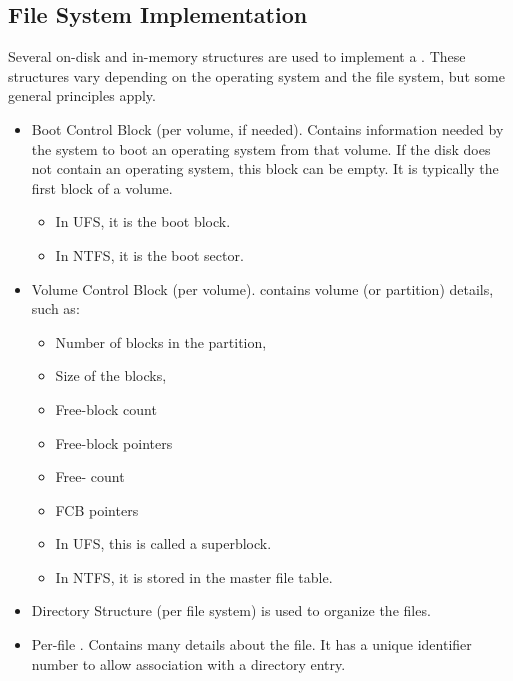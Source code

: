 \subsection{File System Implementation}\label{subsec:FS_Implementation}
Several on-disk and in-memory structures are used to implement a .
These structures vary depending on the operating system and the file system, but some general principles apply.

\begin{itemize}[noitemsep]
\item Boot Control Block (per volume, if needed).
  Contains information needed by the system to boot an operating system from that volume.
  If the disk does not contain an operating system, this block can be empty.
  It is typically the first block of a volume.
  \begin{itemize}[noitemsep]
  \item In UFS, it is the boot block.
  \item In NTFS, it is the boot sector.
  \end{itemize}

\item Volume Control Block (per volume).
  contains volume (or partition) details, such as:
  \begin{itemize}[noitemsep]
  \item Number of blocks in the partition,
  \item Size of the blocks,
  \item Free-block count
  \item Free-block pointers
  \item Free- count
  \item FCB pointers
  \end{itemize}
  \begin{itemize}[noitemsep]
  \item In UFS, this is called a superblock.
  \item In NTFS, it is stored in the master file table.
  \end{itemize}

\item Directory Structure (per file system) is used to organize the files.

\item Per-file .
  Contains many details about the file.
  It has a unique identifier number to allow association with a directory entry.
\end{itemize}

